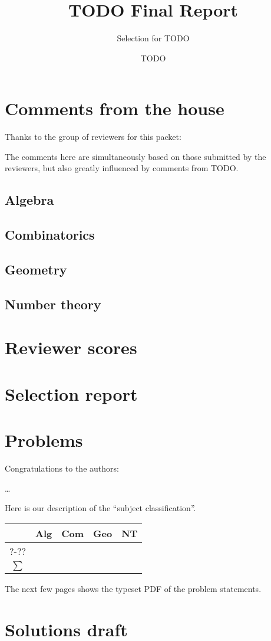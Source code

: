 \documentclass[11pt]{scrreprt}
\begin{document}
\title{TODO Final Report}
\subtitle{Selection for TODO}
\author{TODO}
\maketitle

\tableofcontents

\chapter{Comments from the house}
Thanks to the group of reviewers for this packet:



The comments here are simultaneously based on those submitted by the reviewers,
but also greatly influenced by comments from TODO.

\section{Algebra}
\section{Combinatorics}
\section{Geometry}
\section{Number theory}
\chapter{Reviewer scores}
\setlength\tabcolsep{5pt}


\chapter{Selection report}
\chapter{Problems}
Congratulations to the authors:
\begin{description}
  \ii[\dots] \dots
\end{description}

Here is our description of the ``subject classification''.


\begin{center}
  \begin{tabular}[h]{c rrrr}
    \toprule
    & Alg & Com & Geo & NT \\
    \midrule
    ?-?? &      &      &      &      \\
    \midrule
    $\sum$  &      &      &      &      \\
    \bottomrule
  \end{tabular}
\end{center}

The next few pages
shows the typeset PDF of the problem statements.

% 
% 

\chapter{Solutions draft}
\end{document}
